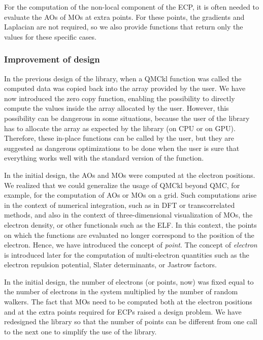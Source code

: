 For the computation of the non-local component of the
\ac{ECP}, it is often needed to evaluate the \acp{AO} of
\acp{MO} at extra points. For these points, the gradients and
Laplacian are not required, so we also provide functions that return only
the values for these specific cases.


\subsubsection{Improvement of design}

In the previous design of the library, when a QMCkl function was called the computed
data was copied back into the array provided by the user. We have now
introduced the zero copy function, enabling the possibility to directly compute the
values inside the array allocated by the user. However, this possibility
can be dangerous in some situations, because the user of the library has to allocate
the array as expected by the library (on CPU or on GPU). Therefore, these in-place functions
can be called by the user, but they are suggested as dangerous
optimizations to be done when the user is sure that everything works
well with the standard version of the function.

In the initial design, the \acp{AO} and \acp{MO} were computed at the
electron positions. We realized that we could generalize the
usage of QMCkl beyond QMC, for example, for the computation of
\acp{AO} or \acp{MO} on a grid. Such computations arise in the context
of numerical integration, such as in \ac{DFT} or transcorrelated methods,
and also in the context of three-dimensional visualization of \acp{MO},
the electron density, or other functionals such as the \ac{ELF}.\cite{silvi_1994}
In this context, the points on which the functions are evaluated no longer
correspond to the position of the electron. Hence, we have introduced the concept of
\emph{point}.  The concept of \emph{electron} is introduced later for the
computation of multi-electron quantities such as the electron repulsion potential,
Slater determinants, or Jastrow factors. 

In the initial design, the number of electrons (or points,
now) was fixed equal to the number of electrons in the system
multiplied by the number of random walkers. The fact that \acp{MO} need to be
computed both at the electron positions and at the extra points required
for \acp{ECP} raised a design problem. We have redesigned
the library so that the number of points can be different from one
call to the next one to simplify the use of the library.

